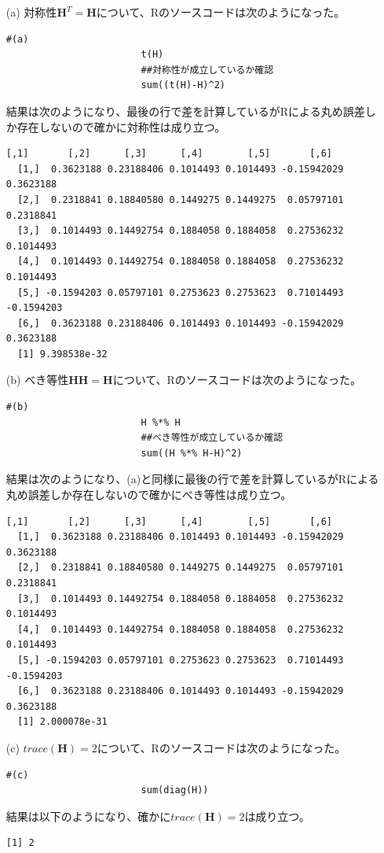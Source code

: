 \documentclass[12pt]{jarticle}
\begin{document}
\begin{enumerate}
\begin{itemize}
              \item [(a)]対称性$\bm H^T=\bm H$について、Rのソースコードは次のようになった。
                    \begin{lstlisting}[style = lstR]
                        #(a)
                        t(H)
                        ##対称性が成立しているか確認
                        sum((t(H)-H)^2)
    \end{lstlisting}
                    結果は次のようになり、最後の行で差を計算しているがRによる丸め誤差しか存在しないので確かに対称性は成り立つ。
                    \begin{lstlisting}[style=log]
             [,1]       [,2]      [,3]      [,4]        [,5]       [,6]
  [1,]  0.3623188 0.23188406 0.1014493 0.1014493 -0.15942029  0.3623188
  [2,]  0.2318841 0.18840580 0.1449275 0.1449275  0.05797101  0.2318841
  [3,]  0.1014493 0.14492754 0.1884058 0.1884058  0.27536232  0.1014493
  [4,]  0.1014493 0.14492754 0.1884058 0.1884058  0.27536232  0.1014493
  [5,] -0.1594203 0.05797101 0.2753623 0.2753623  0.71014493 -0.1594203
  [6,]  0.3623188 0.23188406 0.1014493 0.1014493 -0.15942029  0.3623188
  [1] 9.398538e-32
          \end{lstlisting}
              \item [(b)]べき等性$\bm H \bm H = \bm H$について、Rのソースコードは次のようになった。
                    \begin{lstlisting}[style = lstR]
                        #(b)
                        H %*% H
                        ##べき等性が成立しているか確認
                        sum((H %*% H-H)^2)
\end{lstlisting}
                    結果は次のようになり、(a)と同様に最後の行で差を計算しているがRによる丸め誤差しか存在しないので確かにべき等性は成り立つ。
                    \begin{lstlisting}[style=log]
             [,1]       [,2]      [,3]      [,4]        [,5]       [,6]
  [1,]  0.3623188 0.23188406 0.1014493 0.1014493 -0.15942029  0.3623188
  [2,]  0.2318841 0.18840580 0.1449275 0.1449275  0.05797101  0.2318841
  [3,]  0.1014493 0.14492754 0.1884058 0.1884058  0.27536232  0.1014493
  [4,]  0.1014493 0.14492754 0.1884058 0.1884058  0.27536232  0.1014493
  [5,] -0.1594203 0.05797101 0.2753623 0.2753623  0.71014493 -0.1594203
  [6,]  0.3623188 0.23188406 0.1014493 0.1014493 -0.15942029  0.3623188
  [1] 2.000078e-31
  \end{lstlisting}
              \item [(c)]$trace(\bm H)= 2$について、Rのソースコードは次のようになった。
                    \begin{lstlisting}[style = lstR]
                        #(c)
                        sum(diag(H))
\end{lstlisting}
                    結果は以下のようになり、確かに$trace(\bm H)= 2$は成り立つ。
                    \begin{lstlisting}[style=log]
        [1] 2
\end{lstlisting}
          \end{itemize}


\end{enumerate}
\end{document}
